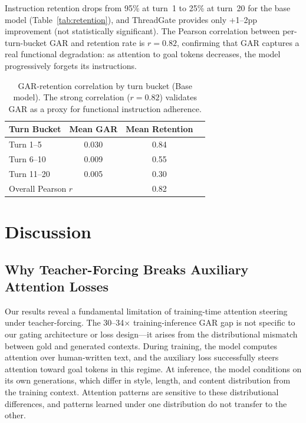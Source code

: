 \documentclass[11pt,a4paper]{article}
\begin{document}
Instruction retention drops from 95\% at turn~1 to 25\% at turn~20 for the base model (Table~\ref{tab:retention}), and ThreadGate provides only +1--2pp improvement (not statistically significant).
The Pearson correlation between per-turn-bucket GAR and retention rate is $r = 0.82$, confirming that GAR captures a real functional degradation: as attention to goal tokens decreases, the model progressively forgets its instructions.

\begin{table}[h]
\centering
\caption{GAR-retention correlation by turn bucket (Base model). The strong correlation ($r=0.82$) validates GAR as a proxy for functional instruction adherence.}
\label{tab:gar-retention}
\begin{tabular}{lccc}
\toprule
\textbf{Turn Bucket} & \textbf{Mean GAR} & \textbf{Mean Retention} \\
\midrule
Turn 1--5   & 0.030 & 0.84 \\
Turn 6--10  & 0.009 & 0.55 \\
Turn 11--20 & 0.005 & 0.30 \\
\midrule
\multicolumn{2}{l}{Overall Pearson $r$} & 0.82 \\
\bottomrule
\end{tabular}
\end{table}

\section{Discussion}

\subsection{Why Teacher-Forcing Breaks Auxiliary Attention Losses}

Our results reveal a fundamental limitation of training-time attention steering under teacher-forcing.
The 30--34$\times$ training-inference GAR gap is not specific to our gating architecture or loss design---it arises from the distributional mismatch between gold and generated contexts.
During training, the model computes attention over human-written text, and the auxiliary loss successfully steers attention toward goal tokens in this regime.
At inference, the model conditions on its own generations, which differ in style, length, and content distribution from the training context.
Attention patterns are sensitive to these distributional differences, and patterns learned under one distribution do not transfer to the other.
\end{document}
